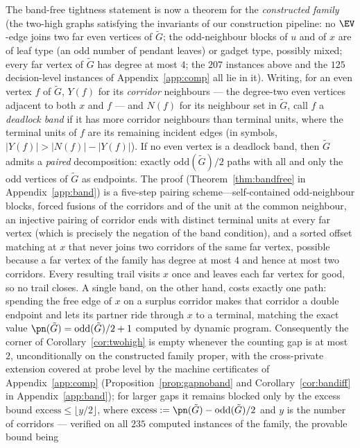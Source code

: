 \begin{remark}
The band-free tightness statement is now a theorem for the \emph{constructed family} (the
two-high graphs satisfying the invariants of our construction pipeline: no $\EV$-edge joins
two far even vertices of $\tilde G$; the odd-neighbour blocks of $u$ and of $x$ are of leaf
type (an odd number of pendant leaves) or gadget type, possibly mixed; every far vertex of
$\tilde G$ has degree at most $4$; the $207$ instances above and the $125$ decision-level
instances of Appendix~\ref{app:comp} all lie in it). Writing, for an even vertex $f$ of
$\tilde G$, $Y(f)$ for its \emph{corridor} neighbours --- the degree-two even vertices
adjacent to both $x$ and $f$ --- and $N(f)$ for its neighbour set in $\tilde G$, call $f$ a
\emph{deadlock band} if it has more corridor neighbours than terminal units, where the
terminal units of $f$ are its remaining incident edges (in symbols,
$|Y(f)|>|N(f)|-|Y(f)|$). If no even vertex is a deadlock band, then $\tilde G$ admits a
\emph{paired} decomposition: exactly $\mathrm{odd}(\tilde G)/2$ paths with all and only the
odd vertices of $\tilde G$ as endpoints. The proof (Theorem~\ref{thm:bandfree} in
Appendix~\ref{app:band}) is a five-step pairing
scheme---self-contained odd-neighbour blocks, forced fusions of the corridors and of the unit
at the common neighbour, an injective pairing of corridor ends with distinct terminal units
at every far vertex (which is precisely the negation of the band condition), and a sorted
offset matching at $x$ that never joins two corridors of the same far vertex, possible
because a far vertex of the family has degree at most $4$ and hence at most two corridors.
Every resulting trail visits $x$ once and leaves each far vertex for good, so no trail
closes. A single band, on the other hand, costs exactly one path: spending the free edge of
$x$ on a surplus corridor makes that corridor a double endpoint and lets its partner ride
through $x$ to a terminal, matching the exact value
$\pn(\tilde G)=\mathrm{odd}(\tilde G)/2+1$ computed by dynamic program. Consequently the
corner of Corollary~\ref{cor:twohigh} is empty whenever the counting gap is at most $2$,
unconditionally on the constructed family proper, with the cross-private extension covered
at probe level by the machine certificates of Appendix~\ref{app:comp} (Proposition~\ref{prop:gapnoband} and
Corollary~\ref{cor:bandiff} in Appendix~\ref{app:band}); for larger gaps it remains blocked only by the
excess bound $\mathrm{excess}\le\lfloor y/2\rfloor$, where
$\mathrm{excess}:=\pn(\tilde G)-\mathrm{odd}(\tilde G)/2$ and $y$ is the number of corridors
--- verified on all $235$ computed instances of the family, the provable bound being

\end{remark}
